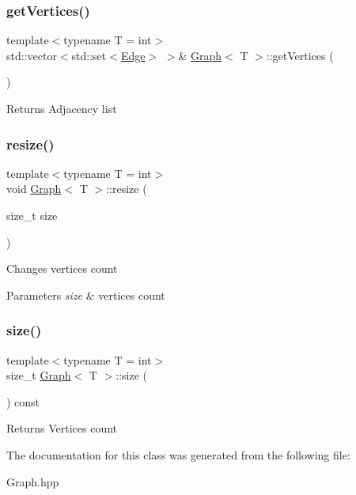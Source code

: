 \subsubsection{\texorpdfstring{get\+Vertices()}{getVertices()}\hspace{0.1cm}{\footnotesize\ttfamily [2/2]}}
{\footnotesize\ttfamily template$<$typename T = int$>$ \\
std\+::vector$<$std\+::set$<$\hyperlink{struct_graph_1_1_edge}{Edge}$>$ $>$\& \hyperlink{class_graph}{Graph}$<$ T $>$\+::get\+Vertices (\begin{DoxyParamCaption}{ }\end{DoxyParamCaption})\hspace{0.3cm}{\ttfamily [inline]}}

\begin{DoxyReturn}{Returns}
Adjacency list 
\end{DoxyReturn}
\mbox{\label{class_graph_a2097e3c0a42566a047e922c21ee1bb73}} 
\subsubsection{\texorpdfstring{resize()}{resize()}}
{\footnotesize\ttfamily template$<$typename T = int$>$ \\
void \hyperlink{class_graph}{Graph}$<$ T $>$\+::resize (\begin{DoxyParamCaption}\item[{size\+\_\+t}]{size }\end{DoxyParamCaption})\hspace{0.3cm}{\ttfamily [inline]}}

Changes vertices count 
\begin{DoxyParams}{Parameters}
{\em size} & vertices count \\
\hline
\end{DoxyParams}
\mbox{\label{class_graph_a27cef878a072784aeca6dc1863b39ecb}} 
\subsubsection{\texorpdfstring{size()}{size()}}
{\footnotesize\ttfamily template$<$typename T = int$>$ \\
size\+\_\+t \hyperlink{class_graph}{Graph}$<$ T $>$\+::size (\begin{DoxyParamCaption}{ }\end{DoxyParamCaption}) const\hspace{0.3cm}{\ttfamily [inline]}}

\begin{DoxyReturn}{Returns}
Vertices count 
\end{DoxyReturn}


The documentation for this class was generated from the following file\+:\begin{DoxyCompactItemize}
\item 
Graph.\+hpp\end{DoxyCompactItemize}
